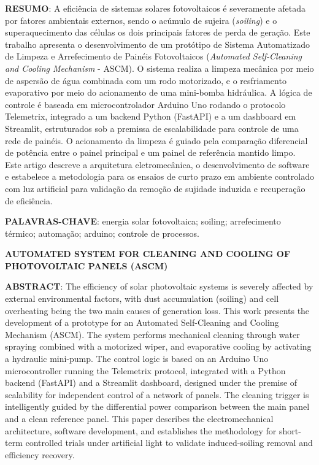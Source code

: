\documentclass[a4paper,11pt]{article}
\begin{document}


\vspace{0.5cm}
\noindent\textbf{RESUMO}: A eficiência de sistemas solares fotovoltaicos é severamente afetada por fatores ambientais externos, sendo o acúmulo de sujeira (\textit{soiling}) e o superaquecimento das células os dois principais fatores de perda de geração. Este trabalho apresenta o desenvolvimento de um protótipo de Sistema Automatizado de Limpeza e Arrefecimento de Painéis Fotovoltaicos (\textit{Automated Self-Cleaning and Cooling Mechanism} - ASCM). O sistema realiza a limpeza mecânica por meio de aspersão de água combinada com um rodo motorizado, e o resfriamento evaporativo por meio do acionamento de uma mini-bomba hidráulica. A lógica de controle é baseada em microcontrolador Arduino Uno rodando o protocolo Telemetrix, integrado a um backend Python (FastAPI) e a um dashboard em Streamlit, estruturados sob a premissa de escalabilidade para controle de uma rede de painéis. O acionamento da limpeza é guiado pela comparação diferencial de potência entre o painel principal e um painel de referência mantido limpo. Este artigo descreve a arquitetura eletromecânica, o desenvolvimento de software e estabelece a metodologia para os ensaios de curto prazo em ambiente controlado com luz artificial para validação da remoção de sujidade induzida e recuperação de eficiência.

\vspace{0.5cm}
\noindent\textbf{PALAVRAS-CHAVE}: energia solar fotovoltaica; soiling; arrefecimento térmico; automação; arduino; controle de processos.

\vspace{0.5cm}
 \begin{center}
 \textbf{AUTOMATED SYSTEM FOR CLEANING AND COOLING OF PHOTOVOLTAIC PANELS (ASCM)}
 \end{center}

\noindent\textbf{ABSTRACT}: The efficiency of solar photovoltaic systems is severely affected by external environmental factors, with dust accumulation (soiling) and cell overheating being the two main causes of generation loss. This work presents the development of a prototype for an Automated Self-Cleaning and Cooling Mechanism (ASCM). The system performs mechanical cleaning through water spraying combined with a motorized wiper, and evaporative cooling by activating a hydraulic mini-pump. The control logic is based on an Arduino Uno microcontroller running the Telemetrix protocol, integrated with a Python backend (FastAPI) and a Streamlit dashboard, designed under the premise of scalability for independent control of a network of panels. The cleaning trigger is intelligently guided by the differential power comparison between the main panel and a clean reference panel. This paper describes the electromechanical architecture, software development, and establishes the methodology for short-term controlled trials under artificial light to validate induced-soiling removal and efficiency recovery.
\end{document}
